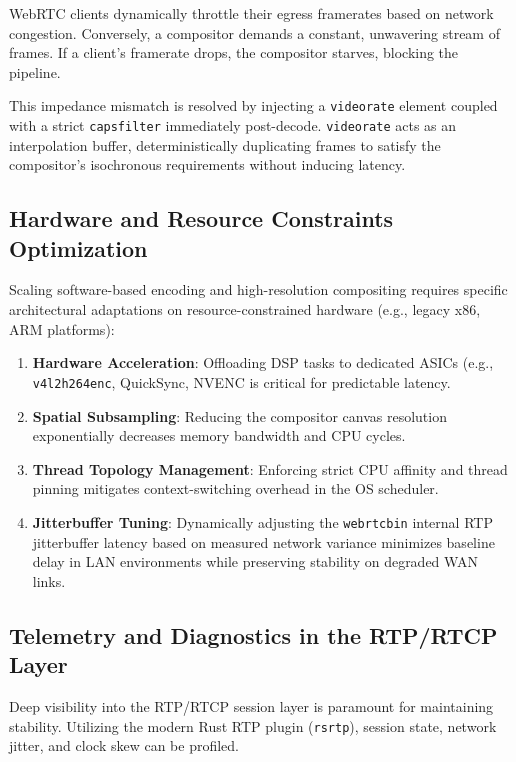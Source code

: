 \documentclass{article}
\begin{document}
WebRTC clients dynamically throttle their egress framerates based on network congestion. Conversely,
a compositor demands a constant, unwavering stream of frames. If a client's framerate drops,
the compositor starves, blocking the pipeline.

This impedance mismatch is resolved by injecting a \texttt{videorate} element coupled with a strict \texttt{capsfilter}
immediately post-decode. \texttt{videorate} acts as an interpolation buffer, deterministically duplicating frames
to satisfy the compositor's isochronous requirements without inducing latency.

\subsection{Hardware and Resource Constraints Optimization}

Scaling software-based encoding and high-resolution compositing requires specific architectural
adaptations on resource-constrained hardware (e.g., legacy x86, ARM platforms):

\begin{enumerate}
\item \textbf{Hardware Acceleration}: Offloading DSP tasks to dedicated ASICs (e.g., \texttt{v4l2h264enc}, QuickSync, NVENC is critical for predictable latency.
\item \textbf{Spatial Subsampling}: Reducing the compositor canvas resolution exponentially decreases memory bandwidth and CPU cycles.
\item \textbf{Thread Topology Management}: Enforcing strict CPU affinity and thread pinning mitigates context-switching overhead in the OS scheduler.
\item \textbf{Jitterbuffer Tuning}: Dynamically adjusting the \texttt{webrtcbin} internal RTP jitterbuffer latency based on measured network variance minimizes baseline delay in LAN environments while preserving stability on degraded WAN links.
\end{enumerate}

\subsection{Telemetry and Diagnostics in the RTP/RTCP Layer}

Deep visibility into the RTP/RTCP session layer is paramount for maintaining stability. Utilizing the modern Rust RTP plugin (\texttt{rsrtp}), session state, network jitter, and clock skew can be profiled.
\end{document}
